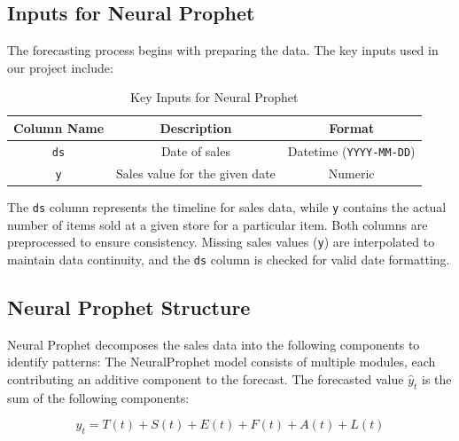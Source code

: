 \subsection{Inputs for Neural Prophet}

The forecasting process begins with preparing the data. The key inputs used in our project include:

\begin{table}[h!]
\centering
\begin{tabular}{|c|c|c|}
\hline
\textbf{Column Name} & \textbf{Description} & \textbf{Format} \\
\hline
\texttt{ds} & Date of sales & Datetime (\texttt{YYYY-MM-DD}) \\
\hline
\texttt{y} & Sales value for the given date & Numeric \\
\hline
\end{tabular}
\caption{Key Inputs for Neural Prophet}
\end{table}

The \texttt{ds} column represents the timeline for sales data, while \texttt{y} contains the actual number of items sold at a given store for a particular item. Both columns are preprocessed to ensure consistency. Missing sales values (\texttt{y}) are interpolated to maintain data continuity, and the \texttt{ds} column is checked for valid date formatting.

\subsection{Neural Prophet Structure}

Neural Prophet decomposes the sales data into the following components to identify patterns:
The NeuralProphet model consists of multiple modules, each contributing an additive component to the forecast. The forecasted value \( \hat{y}_t \) is the sum of the following components:

\begin{equation}
\hat{y}_t = T(t) + S(t) + E(t) + F(t) + A(t) + L(t)
\end{equation}


